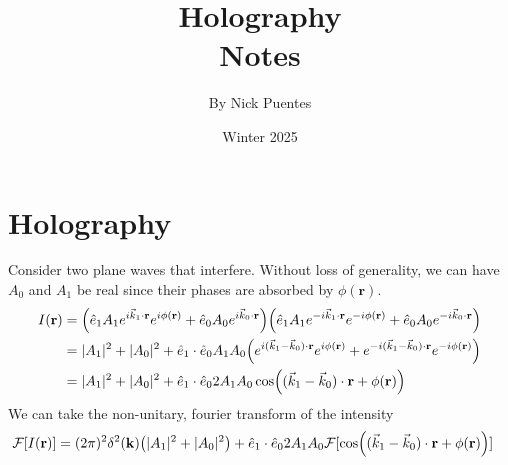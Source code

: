 \documentclass[12pt]{article}
\title{Holography\\Notes}
\author{By Nick Puentes}
\date{Winter 2025}
\begin{document}
\maketitle
\section{Holography}
Consider two plane waves that interfere.
Without loss of generality, we can have $A_0$ and $A_1$ be real since their phases are absorbed by $\phi(\mathbf{r})$.
\begin{align}
    I(\mathbf{r}) &= \qty(\hat{e}_{1}     A_1e^{i\vec{k}_{1}\cdot \mathbf{r}}e^{i \phi(\mathbf{r})} + 
    \hat{e}_{0}     A_0e^{i\vec{k}_{0}\cdot \mathbf{r}})
    \qty(\hat{e}_{1}    A_1e^{-i\vec{k}_{1}\cdot \mathbf{r}}e^{-i \phi(\mathbf{r})} + 
    \hat{e}_{0}     A_0e^{-i\vec{k}_{0}\cdot \mathbf{r}})\\
    &= |A_1|^2 + |A_0|^2 + 
    \hat{e}_{1}\cdot \hat{e}_{0}     A_1A_0\qty(e^{i(\vec{k}_1 - \vec{k}_0)\cdot \mathbf{r}}e^{i \phi(\mathbf{r})} + 
    e^{-i(\vec{k}_1 - \vec{k}_0)\cdot \mathbf{r}}e^{-i \phi(\mathbf{r})})\\
    &= |A_1|^2 + |A_0|^2 + \hat{e}_{1}\cdot \hat{e}_{0}     2A_1A_0 \cos((\vec{k}_1 - \vec{k}_0)\cdot \mathbf{r} + \phi(\mathbf{r}))
\end{align}
We can take the non-unitary, fourier transform of the intensity
\begin{align}
    \mathcal{F}[I(\mathbf{r})] &= (2\pi)^2 \delta^2(\mathbf{k})\qty(|A_1|^2 + |A_0|^2) + 
    \hat{e}_{1}\cdot \hat{e}_{0}     2A_1A_0 \mathcal{F}[\cos((\vec{k}_1 - \vec{k}_0)\cdot \mathbf{r} + \phi(\mathbf{r}))]
\end{align}
\end{document}

